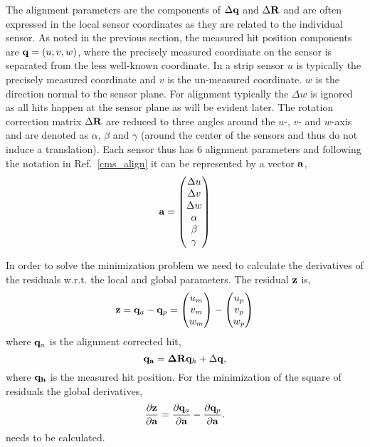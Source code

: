 \documentclass{article}
\def\vec#1{\ensuremath{\mathrm{\bf #1}}}
\def\partder#1#2{\ensuremath{\frac{\partial #1}{\partial #2}}}
\begin{document}
The alignment parameters are the components of $\Delta \vec{q}$ and $\Delta \vec{R}$ and are 
often expressed in the local sensor coordinates as they are related to the individual sensor. As noted in the previous section, the  
measured hit position components are $\vec{q}=\left(u,v,w\right)$, where the precisely measured 
coordinate on the sensor is separated from the less well-known coordinate. In a strip sensor $u$ 
is typically the precisely measured coordinate and $v$ is the un-measured coordinate. $w$ is the direction normal to the sensor plane. For alignment typically the $\Delta w$ is ignored as all hits happen at the sensor plane as will be evident later. The rotation correction matrix $\Delta \vec{R}$ are reduced to three angles around the $u$-, $v$- and $w$-axis and are denoted as $\alpha$, $\beta$ and $\gamma$ (around the center of the sensors and thus do not induce a translation). Each sensor thus has 6 alignment parameters and following the notation in Ref.~\ref{cms_align} it can be represented by a vector \vec{a},
\[
 \vec{a} = 
 \begin{pmatrix}
 \Delta u \\
 \Delta v \\
 \Delta w \\
 \alpha \\
\beta \\
\gamma
 \end{pmatrix}
\]

In order to solve the minimization problem we need to calculate the derivatives of the residuals 
w.r.t. the local and global parameters. The residual \vec{z} is,
\[
\vec{z} =  \vec{q}_a - \vec{q}_p = 
\begin{pmatrix}
u_m \\
v_m \\
w_m 
 \end{pmatrix}
 - 
\begin{pmatrix}
u_p \\
v_p \\
w_p 
 \end{pmatrix}
\]
where $\vec{q}_a$ is the alignment corrected hit,
\begin{equation}
\vec{q_a} = \vec{\Delta R}  \vec{q}_h + \Delta \vec{q},
\end{equation}
where \vec{q_h} is the measured hit position. For the minimization of the square of residuals 
the  global derivatives,
\begin{equation}
\partder{\vec{z}}{\vec{a}}  =  \partder{\vec{q}_a}{\vec{a}} - \partder{\vec{q}_p}{\vec{a}}. 
\label{eq:zdergl}
\end{equation}
needs to be calculated. 
\end{document}
